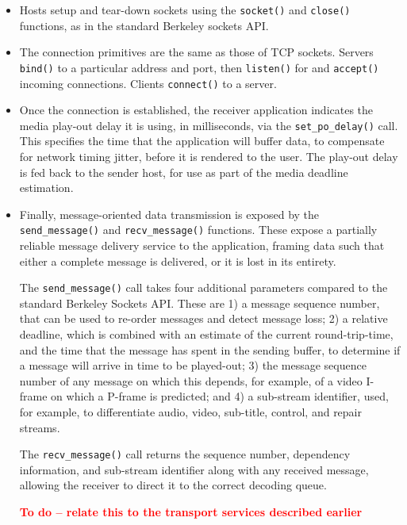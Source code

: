 \documentclass[10pt]{sig-alternate-05-2015}
\newcommand{\todo}[1]{\textbf{\textcolor{red}{To do -- #1}}}
\begin{document}
\begin{itemize}
  \item Hosts setup and tear-down sockets using the \texttt{socket()}
    and \texttt{close()} functions, as in the standard Berkeley sockets
    API.

  \item The connection primitives are the same as those of TCP sockets.
    Servers \texttt{bind()} to a particular address and port, then
    \texttt{listen()} for and \texttt{accept()} incoming connections.
    Clients \texttt{connect()} to a server.

   \item Once the connection is established, the receiver application
     indicates the media play-out delay it is using, in milliseconds, via
     the \texttt{set\_po\_delay()} call. This specifies the time that the
     application will buffer data, to compensate for network timing jitter,
     before it is rendered to the user. The play-out delay is fed back to
     the sender host, for use as part of the media deadline estimation.

  \item Finally, message-oriented data transmission is exposed by the
    \texttt{send\_message()} and \texttt{recv\_message()} functions.
    These expose a partially reliable message delivery service to the
    application, framing data such that either a complete message is
    delivered, or it is lost in its entirety.

    The \texttt{send\_message()} call takes four additional parameters
    compared to the standard Berkeley Sockets API. These are 1) a
    message sequence number, that can be used to re-order messages and
    detect message loss; 2) a relative deadline, which is combined
    with an estimate of the current round-trip-time, and the time that
    the message has spent in the sending buffer, to determine if a
    message will arrive in time to be played-out; 3) the message
    sequence number of any message on which this depends, for example,
    of a video I-frame on which a P-frame is predicted; and 4) a
    sub-stream identifier, used, for example, to differentiate audio,
    video, sub-title, control, and repair streams.

    The \texttt{recv\_message()} call returns the sequence number,
    dependency information, and sub-stream identifier along with any
    received message, allowing the receiver to direct it to the correct
    decoding queue.

    \todo{relate this to the transport services described earlier}

\end{itemize}
\end{document}
